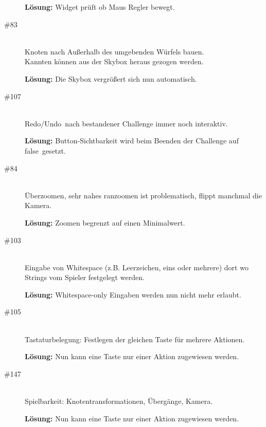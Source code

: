 \begin{description}
{\bfseries Lösung:} Widget prüft ob Maus Regler bewegt.


\item[\#83] \hfill \\
Knoten nach Außerhalb des umgebenden Würfels bauen. \\
Kannten können aus der Skybox heraus gezogen werden.

{\bfseries Lösung:} Die Skybox vergrößert sich nun automatisch.


\item[\#107] \hfill \\

\glqq Redo/Undo\grqq~nach bestandener Challenge immer noch interaktiv. 

{\bfseries Lösung:} Button-Sichtbarkeit wird beim Beenden der Challenge auf 
\glqq false\grqq~gesetzt.

\item[\#84] \hfill \\

\glqq Überzoomen\grqq, sehr nahes ranzoomen ist problematisch, flippt manchmal die Kamera.

{\bfseries Lösung:} Zoomen begrenzt auf einen Minimalwert.


\item[\#103] \hfill \\
Eingabe von Whitespace (z.B. Leerzeichen, eins oder mehrere) dort wo Strings vom Spieler festgelegt werden. 

{\bfseries Lösung:} Whitespace-only Eingaben werden nun nicht mehr erlaubt.


\item[\#105] \hfill \\
Tastaturbelegung: Festlegen der gleichen Taste für mehrere Aktionen. 

{\bfseries Lösung:} Nun kann eine Taste nur einer Aktion zugewiesen werden.


\item[\#147] \hfill \\
Spielbarkeit: Knotentransformationen, Übergänge, Kamera. 

{\bfseries Lösung:} Nun kann eine Taste nur einer Aktion zugewiesen werden.


\end{description}

~\\


